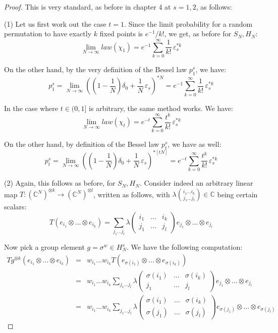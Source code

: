 \documentclass[12pt]{amsbook}
\begin{document}
\begin{proof}
This is very standard, as before in chapter 4 at $s=1,2$, as follows:

\medskip

(1) Let us first work out the case $t=1$. Since the limit probability for a random permutation to have exactly $k$ fixed points is $e^{-1}/k!$, we get, as before for $S_N,H_N$:
$$\lim_{N\to\infty}law(\chi_1)=e^{-1}\sum_{k=0}^\infty \frac{1}{k!}\,\varepsilon_s^{*k}$$

On the other hand, by the very definition of the Bessel law $p^s_1$, we have:
$$p^s_1
=\lim_{N\to\infty}\left(\left(1-\frac{1}{N}\right)\delta_0+\frac{1}{N}\,\varepsilon_s\right)^{*N}
=e^{-1}\sum_{k=0}^\infty\frac{1}{k!}\,\varepsilon_s^{*k}$$

In the case where $t\in(0,1]$ is arbitrary, the same method works. We have:
$$\lim_{N\to\infty}law(\chi_t)=e^{-t}\sum_{k=0}^\infty\frac{t^k}{k!}\,\varepsilon_s^{*k}$$

On the other hand, by definition of the Bessel law $p^s_t$, we have as well:
$$p^s_t=\lim_{N\to\infty}\left(\left(1-\frac{1}{N}\right)\delta_0+\frac{1}{N}\,\varepsilon_s\right)^{*[tN]}=e^{-t}\sum_{k=0}^\infty\frac{t^k}{k!}\,\varepsilon_s^{*k}$$

(2) Again, this follows as before, for $S_N,H_N$. Consider indeed an arbitrary linear map $T:(\mathbb C^N)^{\otimes k}\to(\mathbb C^N)^{\otimes l}$, written as follows, with $\lambda\binom{i_1\ldots i_k}{j_1\ldots j_l}\in\mathbb C$ being certain scalars:
$$T(e_{i_1}\otimes\ldots\otimes e_{i_k})=\sum_{j_1\ldots j_l}\lambda
\begin{pmatrix}i_1&\ldots& i_k\\ j_1&\ldots& j_l\end{pmatrix}e_{j_1}\otimes\ldots\otimes e_{j_l}$$

Now pick a group element $g=\sigma^w\in H_N^s$. We have the following computation:
\begin{eqnarray*}
Tg^{\otimes k}(e_{i_1}\otimes\ldots\otimes e_{i_k})
&=&w_{i_1}\ldots w_{i_k}T(e_{\sigma(i_1)}\otimes\ldots\otimes e_{\sigma(i_k)})\\
&=&w_{i_1}\ldots w_{i_k}\sum_{j_1\ldots j_l}\lambda
\begin{pmatrix}\sigma(i_1)&\ldots&\sigma(i_k)\\ j_1&\ldots& j_l\end{pmatrix}e_{j_1}\otimes\ldots\otimes e_{j_l}\\
&=&w_{i_1}\ldots w_{i_k}\sum_{j_1\ldots j_l}\lambda
\begin{pmatrix}\sigma(i_1)&\ldots&\sigma(i_k)\\ \sigma(j_1)&\ldots&\sigma(j_l)\end{pmatrix}e_{\sigma(j_1)}\otimes\ldots\otimes e_{\sigma(j_l)}
\end{eqnarray*}


\end{proof}
\end{document}
